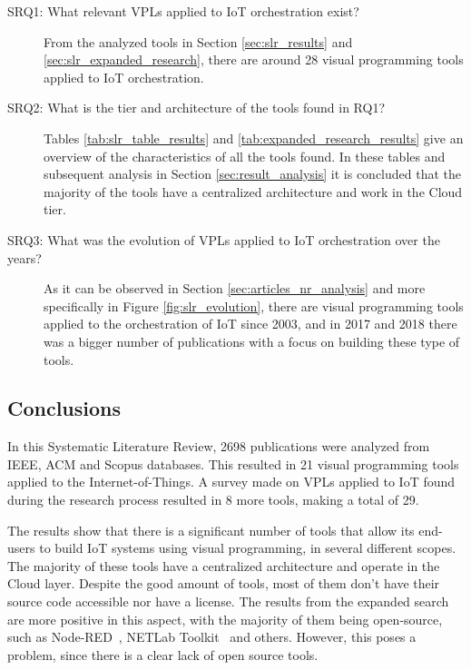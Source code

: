 \begin{description}
    \item [SRQ1: What relevant VPLs applied to IoT orchestration exist?] From the analyzed tools in Section \ref{sec:slr_results} and \ref{sec:slr_expanded_research}, there are around 28 visual programming tools applied to IoT orchestration. 
    \item [SRQ2: What is the tier and architecture of the tools found in RQ1?] Tables \ref{tab:slr_table_results} and \ref{tab:expanded_research_results} give an overview of the characteristics of all the tools found. In these tables and subsequent analysis in Section \ref{sec:result_analysis} it is concluded that the majority of the tools have a centralized architecture and work in the Cloud tier.
    \item [SRQ3: What was the evolution of VPLs applied to IoT orchestration over the years?] As it can be observed in Section \ref{sec:articles_nr_analysis} and more specifically in Figure \ref{fig:slr_evolution}, there are visual programming tools applied to the orchestration of IoT since 2003, and in 2017 and 2018 there was a bigger number of publications with a focus on building these type of tools.  
\end{description}


\subsection{Conclusions}\label{sec:slr_conclusions}

In this Systematic Literature Review, 2698 publications were analyzed from IEEE, ACM and Scopus databases. This resulted in 21 visual programming tools applied to the Internet-of-Things. A survey made on VPLs applied to IoT found during the research process resulted in 8 more tools, making a total of 29.

The results show that there is a significant number of tools that allow its end-users to build IoT systems using visual programming, in several different scopes. The majority of these tools have a centralized architecture and operate in the Cloud layer. Despite the good amount of tools, most of them don't have their source code accessible nor have a license. The results from the expanded search are more positive in this aspect, with the majority of them being open-source, such as Node-RED~\cite{node_red}, NETLab Toolkit~\cite{netlabtoolkit} and others. However, this poses a problem, since there is a clear lack of open source tools.

